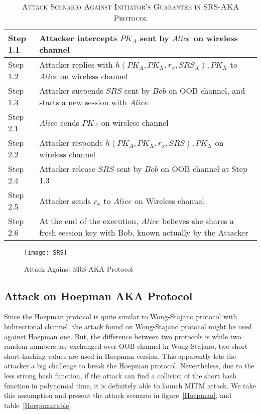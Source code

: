 \begin{table}[t]
\centering
\caption{\textsc{Attack Scenario Against Initiator's Guarantee in SRS-AKA Protocol}}
\label{SRSattacktable}
{\small
\begin{tabular}{| l | p{11cm} |}
 \hline
 Step 1.1 & Attacker intercepts $PK_A$ sent by $Alice$ on wireless channel\\ \hline
 Step 1.2 & Attacker replies with $h(PK_A,PK_X,r_x,SRS_X), PK_X$ to $Alice$ on wireless channel\\ \hline
 Step 1.3 & Attacker suspends $SRS$ sent by $Bob$ on OOB channel, and starts a new session with $Alice$\\ \hline \hline
 Step 2.1 & $Alice$ sends $PK_A$ on wireless channel\\ \hline
 Step 2.2 & Attacker responds $h(PK_A,PK_X,r_x,SRS), PK_X$  on wireless channel\\ \hline
 Step 2.4 & Attacker release $SRS$ sent by $Bob$ on OOB channel at Step 1.3\\ \hline
 Step 2.5 & Attacker sends $r_x$ to $Alice$ on Wireless channel\\ \hline
 Step 2.6 & At the end of the execution, $Alice$ believes she shares a fresh session key with Bob, known actually by the Attacker\\ \hline
\end{tabular}
}
\end{table}

\begin{figure}
  \centering
  \texttt{[image: SRS]}
  \caption{Attack Against SRS-AKA Protocol}
  \label{SRSattack}
\end{figure}


\subsection{Attack on Hoepman AKA Protocol}

Since the Hoepman protocol is quite similar to Wong-Stajano protocol with bidirectional channel, the attack found on Wong-Stajano protocol might be used against Hoepman one. But, the difference between two protocols is while two random numbers are exchanged over OOB channel in Wong-Stajano, two short short-hashing values are used in Hoepman version. This apparently lets the attacker a big challenge to break the Hoepman protocol. Nevertheless, due to the less strong hash function, if the attack can find a collision of the short hash function in polynomial time, it is definitely able to launch MITM attack. We take this assumption and present the attack scenario in figure~\ref{Hoepman}, and table~\ref{Hoepmantable}. 
   
